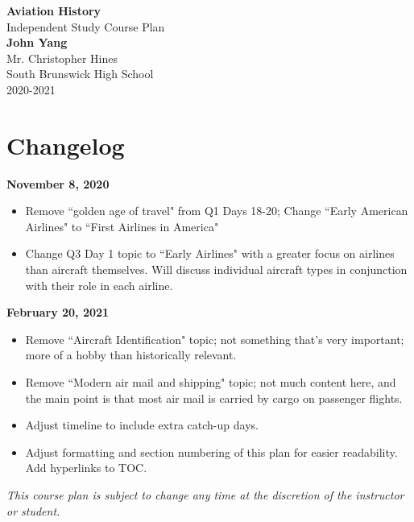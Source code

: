 \documentclass[12pt]{article}
\begin{document}
	\begin{titlepage}
		\begin{center}
			\vspace*{1cm}
			\Huge
				\textbf{Aviation History}\\
			\vspace{0.5cm}
			\LARGE
				Independent Study Course Plan\\
			\vspace{1.5cm}
				\textbf{John Yang}\\
			\vfill
			\vspace{0.8cm}
			\Large
				Mr. Christopher Hines\\
				South Brunswick High School\\
				2020-2021
		\end{center}
	\end{titlepage}\newpage

\section{Changelog}
\textbf{November 8, 2020}
\begin{itemize}
    \item Remove ``golden age of travel" from Q1 Days 18-20; Change ``Early American Airlines"
    to ``First Airlines in America"
    \item Change Q3 Day 1 topic to ``Early Airlines" with a greater focus on airlines than aircraft
    themselves. Will discuss individual aircraft types in conjunction with their role in each
    airline.
\end{itemize}
\textbf{February 20, 2021}
\begin{itemize}
    \item Remove ``Aircraft Identification" topic; not something that's very important; more of a hobby than historically relevant. 
    \item Remove ``Modern air mail and shipping" topic; not much content here, and the main point is that most air mail is carried by cargo on passenger flights. 
    \item Adjust timeline to include extra catch-up days. 
    \item Adjust formatting and section numbering of this plan for easier readability. Add hyperlinks to TOC. 
\end{itemize}

\newpage
\tableofcontents\newpage

\textit{This course plan is subject to change any time at the discretion of the instructor or student.}
\end{document}
